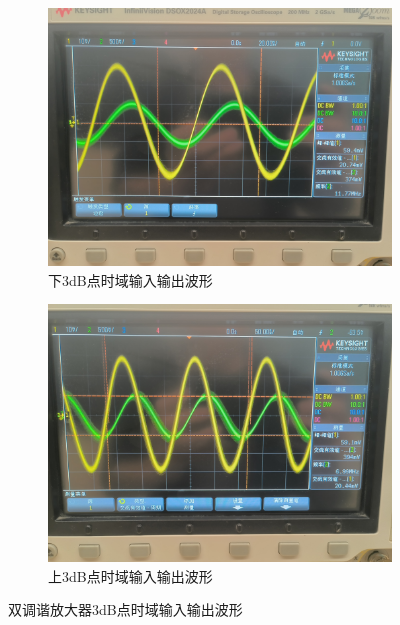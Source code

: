 \documentclass[UTF8]{ctexart}
\begin{document}
\begin{enumerate}[(1)]
    \begin{figure}[H]
        \centering
        \begin{subfigure}[c]{0.45\textwidth}
            \centering
            \includegraphics[width=\textwidth]{pics/3.4.2.png}
            \caption{下3dB点时域输入输出波形}\label{3.4.2}
        \end{subfigure}
        \begin{subfigure}[c]{0.45\textwidth}
            \centering
            \includegraphics[width=\textwidth]{pics/3.4.2(2).png}
            \caption{上3dB点时域输入输出波形}\label{3.4.2(2)}
        \end{subfigure}
        
        \caption{双调谐放大器3dB点时域输入输出波形}\label{3.4.2-}
    \end{figure}


\end{enumerate}
\end{document}
